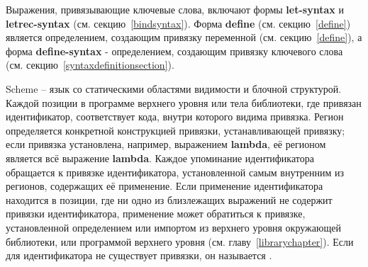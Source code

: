Выражения, привязывающие ключевые слова, включают формы {\cf\bfseries let-syntax} и
{\cf\bfseries letrec-syntax} (см. секцию~\ref{bindsyntax}). Форма {\cf\bfseries define}
(см. секцию~\ref{define}) является определением, создающим привязку переменной
(см. секцию~\ref{define}), а форма {\cf\bfseries define-syntax} - определением, создающим
привязку ключевого слова (см. секцию~\ref{syntaxdefinitionsection}).

\vest Scheme -- язык со статическими областями видимости и блочной структурой. Каждой позиции в
программе верхнего уровня или тела библиотеки, где привязан идентификатор, соответствует
 кода, внутри которого видима привязка. Регион определяется конкретной
конструкцией привязки, устанавливающей привязку; если привязка установлена, например, выражением
{\cf\bfseries lambda}, её регионом является всё выражение {\cf\bfseries lambda}. Каждое
упоминание идентификатора обращается к привязке идентификатора, установленной самым внутренним
из регионов, содержащих её применение. Если применение идентификатора находится в позиции, где
ни одно из близлежащих выражений не содержит привязки идентификатора, применение может
обратиться к привязке, установленной определением или импортом из верхнего уровня окружающей
библиотеки, или программой верхнего уровня (см. главу~\ref {librarychapter}). Если для
идентификатора не существует привязки, он называется .


